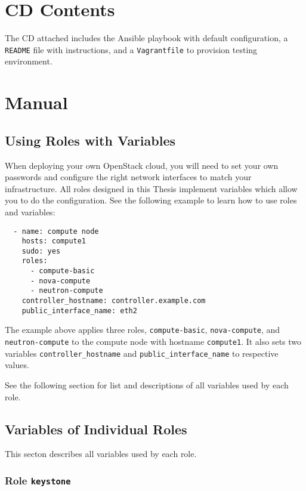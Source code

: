 \chapter{CD Contents}

The CD attached includes the Ansible playbook with default configuration, a \texttt{README} file with instructions, and a \texttt{Vagrantfile} to provision testing environment.

\chapter{Manual}

\section{Using Roles with Variables}

When deploying your own OpenStack cloud, you will need to set your own passwords and configure the right network interfaces to match your infrastructure. All roles designed in this Thesis implement variables which allow you to do the configuration. See the following example to learn how to use roles and variables:

\begin{lstlisting}
  - name: compute node
    hosts: compute1
    sudo: yes
    roles:
      - compute-basic
      - nova-compute
      - neutron-compute
    controller_hostname: controller.example.com
    public_interface_name: eth2
\end{lstlisting}

The example above applies three roles, \texttt{compute-basic}, \texttt{nova-compute}, and \texttt{neutron-compute} to the compute node with hostname \texttt{compute1}. It also sets two variables \texttt{controller\_hostname} and \texttt{public\_interface\_name} to respective values.

See the following section for list and descriptions of all variables used by each role.

\clearpage

\section{Variables of Individual Roles}

This secton describes all variables used by each role.

\subsection{Role \texttt{keystone}}

